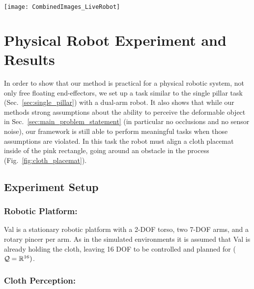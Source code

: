 
\begin{figure*}[ht]
    \centering
    \texttt{[image: CombinedImages\_LiveRobot]}
    \vspace{-1.7in}
    \caption{Cloth placemat task. The placemat starts on the far side of an obstacle and must be aligned with the pink rectangle near the robot.}
    \label{fig:cloth_placemat}
\end{figure*}



\section{Physical Robot Experiment and Results}
\label{sec:live_robot}

In order to show that our method is practical for a physical robotic system, not only free floating end-effectors, we set up a task similar to the single pillar task (Sec.~\ref{sec:single_pillar}) with a dual-arm robot. It also shows that while our methods strong assumptions about the ability to perceive the deformable object in Sec.~\ref{sec:main_problem_statement} (in particular no occlusions and no sensor noise), our framework is still able to perform meaningful tasks when those assumptions are violated. In this task the robot must align a cloth placemat inside of the pink rectangle, going around an obstacle in the process (Fig.~\ref{fig:cloth_placemat}).


\subsection{Experiment Setup}

\subsubsection{Robotic Platform:}
Val is a stationary robotic platform with a 2-DOF torso, two 7-DOF arms, and a rotary pincer per arm. As in the simulated environments it is assumed that Val is already holding the cloth, leaving 16 DOF to be controlled and planned for ($\mathcal{Q} = \mathbb{R}^{16})$.


\subsubsection{Cloth Perception:}
\label{sec:cloth_perception}

